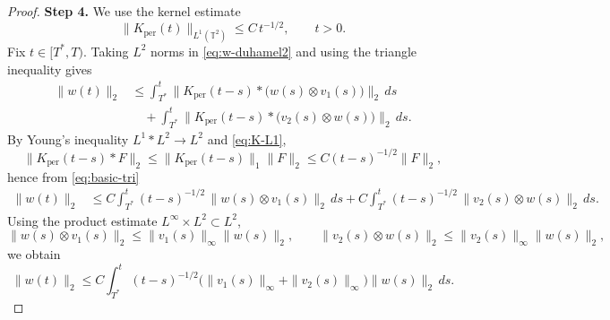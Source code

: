\documentclass[12pt]{article}
\theoremstyle{remark}
\theoremstyle{remark}
\begin{document}
\begin{proof}
\textbf{Step 4.}
We use the kernel estimate
\begin{equation}\label{eq:K-L1}
\|K_{\mathrm{per}}(t)\|_{L^1(\mathbb T^2)}\le C\,t^{-1/2},\qquad t>0.
\end{equation}
Fix $t\in[T^*,T)$. Taking $L^2$ norms in \eqref{eq:w-duhamel2} and using the triangle inequality gives
\begin{align}
\|w(t)\|_{2}
&\le \int_{T^*}^{t}\bigl\|K_{\mathrm{per}}(t-s)*\bigl(w(s)\otimes v_1(s)\bigr)\bigr\|_{2}\,ds
\nonumber\\
&\quad +\int_{T^*}^{t}\bigl\|K_{\mathrm{per}}(t-s)*\bigl(v_2(s)\otimes w(s)\bigr)\bigr\|_{2}\,ds.
\label{eq:basic-tri}
\end{align}
By Young's inequality $L^1*L^2\to L^2$ and \eqref{eq:K-L1},
\[
\|K_{\mathrm{per}}(t-s)*F\|_2\le \|K_{\mathrm{per}}(t-s)\|_1\|F\|_2\le C(t-s)^{-1/2}\|F\|_2,
\]
hence from \eqref{eq:basic-tri}
\begin{align}
\|w(t)\|_2
&\le C\int_{T^*}^{t}(t-s)^{-1/2}\,\|w(s)\otimes v_1(s)\|_2\,ds
+ C\int_{T^*}^{t}(t-s)^{-1/2}\,\|v_2(s)\otimes w(s)\|_2\,ds.
\label{eq:after-young}
\end{align}
Using the product estimate $L^\infty\times L^2\subset L^2$,
\[
\|w(s)\otimes v_1(s)\|_2\le \|v_1(s)\|_\infty\|w(s)\|_2,\qquad
\|v_2(s)\otimes w(s)\|_2\le \|v_2(s)\|_\infty\|w(s)\|_2,
\]
we obtain
\begin{equation}\label{eq:Volterra}
\|w(t)\|_2\le C\int_{T^*}^{t}(t-s)^{-1/2}\bigl(\|v_1(s)\|_\infty+\|v_2(s)\|_\infty\bigr)\|w(s)\|_2\,ds.
\end{equation}


\end{proof}
\end{document}
